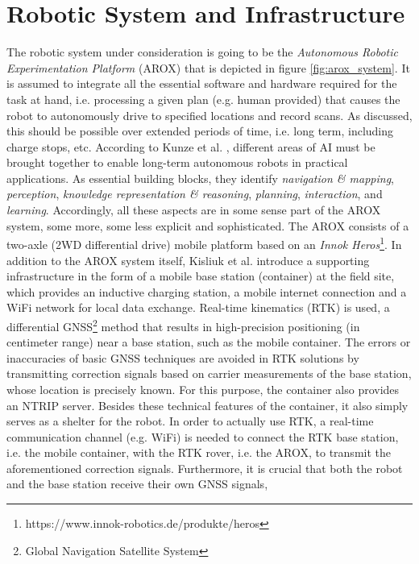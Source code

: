 \documentclass[english, master, utf8]{base/thesis_KBS}
\begin{document}
\section{Robotic System and Infrastructure}
\label{sec:robotic_system}

The robotic system under consideration is going to be the \textit{Autonomous Robotic Experimentation Platform} (AROX) \cite{Kisliuk:2021} that is depicted in figure \ref{fig:arox_system}.
It is assumed to integrate all the essential software and hardware required for the task at hand, i.e. processing a given plan (e.g. human provided) that causes the robot
to autonomously drive to specified locations and record scans. As discussed, this should be possible over extended periods of time, i.e. long term, including charge stops, etc.
According to Kunze et al. \cite{Kunze:2018}, different areas of AI must be brought together to enable long-term autonomous robots in practical applications.
As essential building blocks, they identify \textit{navigation \& mapping}, \textit{perception}, \textit{knowledge representation \& reasoning}, \textit{planning},
\textit{interaction}, and \textit{learning}. Accordingly, all these aspects are in some sense part of the AROX system, some more, some less explicit and sophisticated.
The AROX consists of a two-axle (2WD differential drive) mobile platform based on an \textit{Innok Heros}\footnote{https://www.innok-robotics.de/produkte/heros}. \cite{Kisliuk:2021}
In addition to the AROX system itself, Kisliuk et al. introduce a supporting infrastructure in the form of a mobile base station (container) at the field site,
which provides an inductive charging station, a mobile internet connection and a WiFi network for local data exchange.
Real-time kinematics (RTK) is used, a differential GNSS\footnote{Global Navigation Satellite System} method that results in high-precision positioning (in centimeter range)
near a base station, such as the mobile container. The errors or inaccuracies of basic GNSS techniques are avoided in RTK solutions by transmitting correction signals based
on carrier measurements of the base station, whose location is precisely known. \cite{RTK_fundamentals} For this purpose, the container also provides an NTRIP server.
Besides these technical features of the container, it also simply serves as a shelter for the robot.
In order to actually use RTK, a real-time communication channel (e.g. WiFi) is needed to connect the RTK base station, i.e. the mobile container, with the RTK rover,
i.e. the AROX, to transmit the aforementioned correction signals. Furthermore, it is crucial that both the robot and the base station receive their own GNSS signals, 
\end{document}
